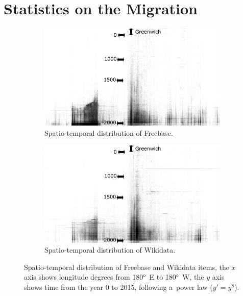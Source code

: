 \documentclass{acm_proc_article-sp}
\begin{document}
\section{Statistics on the Migration}\label{sec:statistics-of-the-migration}

\begin{figure}[h]
    \centering
    \begin{subfigure}[b]{1.0\columnwidth}
        \includegraphics[width=\textwidth]{img/freebase-projection-bw.pdf}
        \caption{Spatio-temporal distribution of Freebase.}
        \label{fig:freebase}
    \end{subfigure}
    \begin{subfigure}[b]{1.0\columnwidth}
        \includegraphics[width=\textwidth]{img/wikidata-projection-bw.pdf}
        \caption{Spatio-temporal distribution of Wikidata.}
        \label{fig:wikidata}
    \end{subfigure}
    \caption{Spatio-temporal distribution of Freebase and Wikidata items,
      the $x$ axis shows longitude degrees from 180°~E to 180°~W, the $y$ axis shows time
      from the year 0 to 2015, following a~power law ($y' = y^8$).}
    \label{fig:time-space}
\end{figure}
\end{document}
